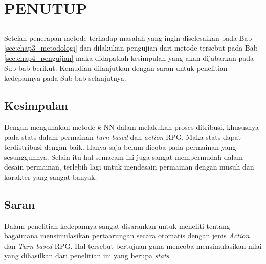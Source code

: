 \chapter{PENUTUP}
\label{sec:chap5_tutup}
\vspace{1ex}

\section*{}
Setelah penerapan metode terhadap masalah yang ingin diselesaikan pada Bab \ref{sec:chap3_metodologi} dan dilakukan pengujian dari metode tersebut pada Bab \ref*{sec:chap4_pengujian} maka didapatlah kesimpulan yang akan dijabarkan pada Sub-bab berikut. Kemudian dilanjutkan dengan saran untuk penelitian kedepannya pada Sub-bab selanjutnya.
\vspace{1ex}

\section{Kesimpulan}
\label{sec:sec4_kesimpulan}
\vspace{1ex}

Dengan mengunakan metode $k$-NN dalam melakukan proses ditribusi, khususnya pada stats dalam permainan \textit{turn-based} dan \textit{action} RPG. Maka stats dapat terdistribusi dengan baik. Hanya saja belum dicoba pada permainan yang sesungguhnya. Selain itu hal semacam ini juga sangat mempermudah dalam desain permainan, terlebih lagi untuk mendesain permainan dengan musuh dan karakter yang sangat banyak.

\section{Saran}
\label{sec:sec4_saran}
\vspace{1ex}

Dalam penelitian kedepannya sangat disarankan untuk meneliti tentang bagaimana mensimulasikan pertaarungan secara otomatis dengan jenis \textit{Action} dan \textit{Turn-based} RPG. Hal tersebut bertujuan guna mencoba mensimulasikan nilai yang dihasilkan dari penelitian ini yang berupa \textit{stats}.